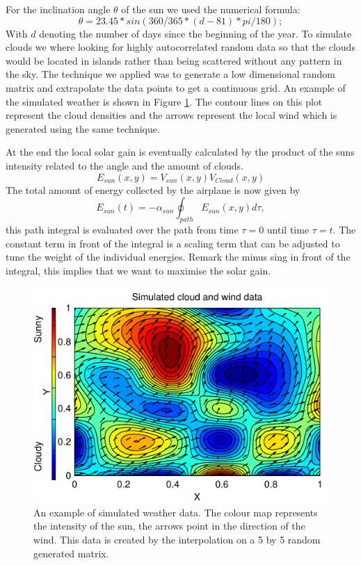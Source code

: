 For the inclination angle $\theta$ of the sun we used the numerical formula:
\begin{equation}
\theta = 23.45 * sin(360/365 * (d -81)*pi/180);
\end{equation}
With $d$ denoting the number of days since the beginning of the year.
To simulate clouds we where looking for highly autocorrelated random data so that the clouds would be located in islands rather than being scattered without any pattern in the sky.
The technique we applied was to generate a low dimensional random matrix and extrapolate the data points to get a continuous grid.
An example of the simulated weather is shown in Figure \ref{fig:RandomWeather}.
The contour lines on this plot represent the cloud densities and the arrows represent the local wind which is generated using the same technique.

At the end the local solar gain is eventually calculated by the product of the suns intensity related to the angle and the amount of clouds.
\begin{equation}
E_{sun}(x,y)  =  V_{sun}(x,y) V_{Cloud}(x,y)
\end{equation}
The total amount of energy collected by the airplane is now given by 
\begin{equation}
E_{sun}(t)  =  -\alpha_{sun}\oint_{path} E_{sun}(x,y)  d\tau,
\end{equation}
this path integral is evaluated over the path from time $ \tau=0 $ until time $ \tau=t $.
The constant term in front of the integral is a scaling term that can be adjusted to tune the weight of the individual energies.
Remark the minus sing in front of the integral, this implies that we want to maximise the solar gain.

\begin{figure}
\centering
\includegraphics[width=0.5\linewidth]{../src/plot/RandomWeather}
\caption{An example of  simulated weather data. The colour map represents the intensity of the sun, the arrows point in the direction of the wind. This data is created by the  interpolation on a 5 by 5 random generated matrix. }
\label{fig:RandomWeather}
\end{figure}



